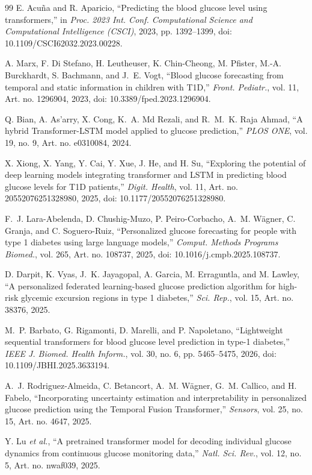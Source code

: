 \documentclass[journal]{IEEEtran}
\begin{document}
\begin{thebibliography}{99}
 E. Acu\~{n}a and R. Aparicio, ``Predicting the blood glucose level using transformers,'' in \emph{Proc. 2023 Int. Conf. Computational Science and Computational Intelligence (CSCI)}, 2023, pp. 1392--1399, doi: 10.1109/CSCI62032.2023.00228.

 A. Marx, F. Di Stefano, H. Leutheuser, K. Chin-Cheong, M. Pfister, M.-A. Burckhardt, S. Bachmann, and J.~E. Vogt, ``Blood glucose forecasting from temporal and static information in children with T1D,'' \emph{Front. Pediatr.}, vol. 11, Art. no. 1296904, 2023, doi: 10.3389/fped.2023.1296904.

 Q. Bian, A. As'arry, X. Cong, K.~A. Md Rezali, and R.~M.~K. Raja Ahmad, ``A hybrid Transformer-LSTM model applied to glucose prediction,'' \emph{PLOS ONE}, vol. 19, no. 9, Art. no. e0310084, 2024.

 X. Xiong, X. Yang, Y. Cai, Y. Xue, J. He, and H. Su, ``Exploring the potential of deep learning models integrating transformer and LSTM in predicting blood glucose levels for T1D patients,'' \emph{Digit. Health}, vol. 11, Art. no. 20552076251328980, 2025, doi: 10.1177/20552076251328980.

 F.~J. Lara-Abelenda, D. Chushig-Muzo, P. Peiro-Corbacho, A.~M. W\"agner, C. Granja, and C. Soguero-Ruiz, ``Personalized glucose forecasting for people with type 1 diabetes using large language models,'' \emph{Comput. Methods Programs Biomed.}, vol. 265, Art. no. 108737, 2025, doi: 10.1016/j.cmpb.2025.108737.

 D. Darpit, K. Vyas, J.~K. Jayagopal, A. Garcia, M. Erraguntla, and M. Lawley, ``A personalized federated learning-based glucose prediction algorithm for high-risk glycemic excursion regions in type 1 diabetes,'' \emph{Sci. Rep.}, vol. 15, Art. no. 38376, 2025.

 M.~P. Barbato, G. Rigamonti, D. Marelli, and P. Napoletano, ``Lightweight sequential transformers for blood glucose level prediction in type-1 diabetes,'' \emph{IEEE J. Biomed. Health Inform.}, vol. 30, no. 6, pp. 5465--5475, 2026, doi: 10.1109/JBHI.2025.3633194.

 A.~J. Rodriguez-Almeida, C. Betancort, A.~M. W\"agner, G.~M. Callico, and H. Fabelo, ``Incorporating uncertainty estimation and interpretability in personalized glucose prediction using the Temporal Fusion Transformer,'' \emph{Sensors}, vol. 25, no. 15, Art. no. 4647, 2025.

 Y. Lu \emph{et al.}, ``A pretrained transformer model for decoding individual glucose dynamics from continuous glucose monitoring data,'' \emph{Natl. Sci. Rev.}, vol. 12, no. 5, Art. no. nwaf039, 2025.


\end{thebibliography}
\end{document}
